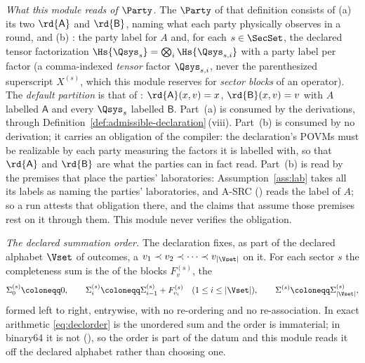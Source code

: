 \begin{definition}
\emph{What this module reads of $\Party$.} The 
$\Party$ of that definition consists of (a) its two
 $\rd{\mathsf A}$ and $\rd{\mathsf B}$,
naming what each party physically observes in a round, and (b)
:
the party label for $A$ and, for each $s\in\SecSet$, the declared tensor
factorization $\Hs{\Qsys_s}=\bigotimes_{i}\Hs{\Qsys_{s,i}}$ with a party
label per factor (a comma-indexed \emph{tensor} factor $\Qsys_{s,i}$, never
the parenthesized superscript $X^{(s)}$, which this module reserves for
\emph{sector blocks} of an operator). The \emph{default partition} is that of
: $\rd{\mathsf A}(x,v)=x$,
$\rd{\mathsf B}(x,v)=v$ with $A$ labelled $\mathsf A$ and every $\Qsys_s$
labelled $\mathsf B$. Part~(a) is consumed by the derivations, through
Definition~\ref{def:admissible-declaration}\,(viii). Part~(b) is consumed by no
derivation; it carries an obligation of the compiler: the declaration's POVMs
must be realizable by each party measuring the factors it is labelled with,
so that $\rd{\mathsf A}$ and $\rd{\mathsf B}$ are what the parties can in fact
read. Part~(b) is read by the premises that place the parties'
laboratories: Assumption~\ref{ass:lab} takes all its labels as naming the
parties' laboratories, and A-SRC () reads the label
of $A$; so a run attests that obligation there, and the claims that assume
those premises rest on it through them. This module never verifies the
obligation.

\emph{The declared summation order.} The declaration fixes, as part of the
declared alphabet $\Vset$ of outcomes, a 
$v_1\prec v_2\prec\dots\prec v_{|\Vset|}$ on it. For each sector $s$ the
completeness sum is the  of the blocks
$F^{(s)}_v$, the 
\begin{equation}\label{eq:declorder}
  \Sigma^{(s)}_0\coloneqq0,\qquad
  \Sigma^{(s)}_i\coloneqq\Sigma^{(s)}_{i-1}+F^{(s)}_{v_i}
  \quad(1\le i\le|\Vset|),\qquad
  \Sigma^{(s)}\coloneqq\Sigma^{(s)}_{|\Vset|},
\end{equation}
formed left to right, entrywise, with no re-ordering and no
re-association. In exact arithmetic \eqref{eq:declorder} is the unordered
sum and the order is immaterial; in binary64 it is not
(), so the order is part of the datum and
this module reads it off the declared alphabet rather than choosing one.


\end{definition}
